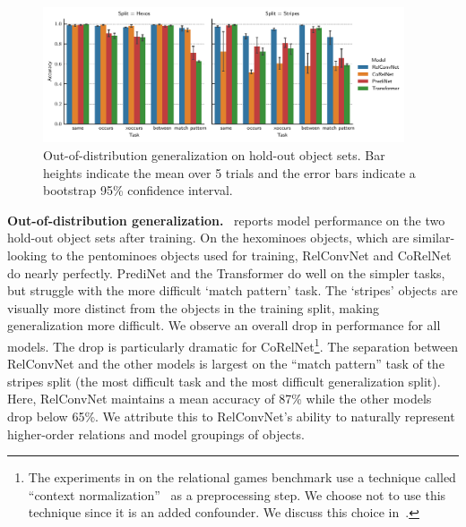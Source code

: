 \begin{figure}[t]
    \centering
    \includegraphics[width=0.95\textwidth]{figs/experiments/relgames_ood_acc.pdf}
    \caption{Out-of-distribution generalization on hold-out object sets. Bar heights indicate the mean over 5 trials and the error bars indicate a bootstrap 95\% confidence interval.}\label{fig:ood_generalization}
\end{figure}

\textbf{Out-of-distribution generalization.}~ reports model performance on the two hold-out object sets after training. On the hexominoes objects, which are similar-looking to the pentominoes objects used for training, RelConvNet and CoRelNet do nearly perfectly. PrediNet and the Transformer do well on the simpler tasks, but struggle with the more difficult `match pattern' task. The `stripes' objects are visually more distinct from the objects in the training split, making generalization more difficult. We observe an overall drop in performance for all models. The drop is particularly dramatic for CoRelNet\footnote{The experiments in \citep{kergNeuralArchitecture2022} on the relational games benchmark use a technique called ``context normalization''~\citep{webbLearningRepresentationsThat2020} as a preprocessing step. We choose not to use this technique since it is an added confounder. We discuss this choice in~.}.
The separation between RelConvNet and the other models is largest on the ``match pattern'' task of the stripes split (the most difficult task and the most difficult generalization split). Here, RelConvNet maintains a mean accuracy of 87\% while the other models drop below 65\%. We attribute this to RelConvNet's ability to naturally represent higher-order relations and model groupings of objects.



